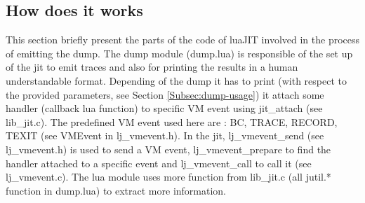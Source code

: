 \subsection{How does it works}
\label{Subsec:dump-internals}

This section briefly present the parts of the code of luaJIT involved in the process of
emitting the dump. The dump module (dump.lua) is responsible of the set up of the
jit to emit traces and also for printing the results in a human understandable
format. Depending of the dump it has to print (with respect to the provided
parameters, see Section \ref{Subsec:dump-usage}) it attach some handler
(callback lua function) to specific VM event using jit\_attach (see lib\_jit.c).
The predefined VM event used here are : BC, TRACE, RECORD, TEXIT
(see VMEvent in lj\_vmevent.h). In the jit, lj\_vmevent\_send (see lj\_vmevent.h)
is used to send a VM event, lj\_vmevent\_prepare to find the handler attached to a
specific event and lj\_vmevent\_call to call it (see lj\_vmevent.c).
The lua module uses more function from lib\_jit.c (all jutil.* function
in dump.lua) to extract more information.
